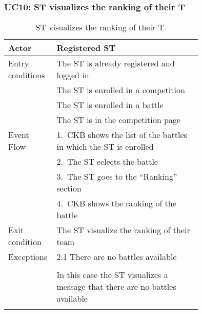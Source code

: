 \subsubsection*{UC10: ST visualizes the ranking of their T}
\begin{center}
  \begin{longtable}{l|p{0.75\linewidth}}
    \hline
    Actor & Registered ST \\
    \hline
    Entry conditions & The ST is already registered and logged in \\
    & The ST is enrolled in a competition \\
    & The ST is enrolled in a battle \\
    & The ST is in the competition page \\
    \hline
    Event Flow & 1.\ CKB shows the list of the battles in which the ST is enrolled \\
    & 2.\ The ST selects the battle \\
    & 3.\ The ST goes to the “Ranking” section \\
    & 4.\ CKB shows the ranking of the battle \\
    \hline
    Exit condition &  The ST visualize the ranking of their team \\
    \hline
    Exceptions & 2.1 There are no battles available \\ \\
    & In this case the ST visualizes a message that there are no battles available \\
    \hline
    \caption{ST visualizes the ranking of their T.}
    \label{tab: ST_visualize_ranking}
  \end{longtable}
\end{center}

